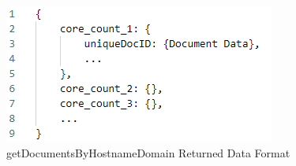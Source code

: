 \begin{figure}[H]
    \centering
    \includegraphics{img/getdocumentsbyhostnamedomain2.PNG}
    \caption{getDocumentsByHostnameDomain Returned Data Format}
    \label{fig:getdocumentsbyhostnamedomain2}
\end{figure}
